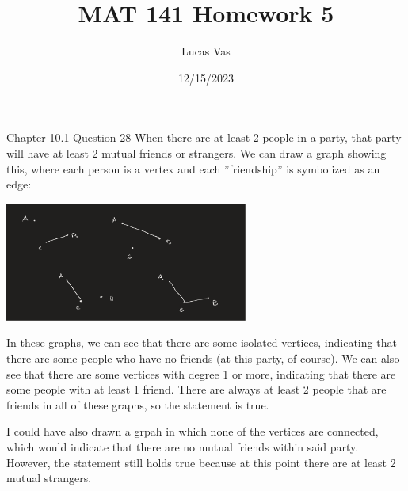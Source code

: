 \documentclass[12pt]{article}
\title{MAT 141 Homework 5}
\author{Lucas Vas}
\date{12/15/2023}
\begin{document}
\maketitle

  \begin{problem}{Chapter 10.1 Question 28}
    When there are at least 2 people in a party, that party will have at least 2 mutual friends or strangers.
    We can draw a graph showing this, where each person is a vertex and each ''friendship'' is symbolized as
    an edge:
    \begin{center}
      \includegraphics[width=8cm]{2friends.png}
    \end{center}
    In these graphs, we can see that there are some isolated vertices, indicating that there are some people
    who have no friends (at this party, of course). We can also see that there are some vertices with degree
    1 or more, indicating that there are some people with at least 1 friend. There are always at least 2 people
    that are friends in all of these graphs, so the statement is true.

    I could have also drawn a grpah in which none of the vertices are connected, which would indicate that 
    there are no mutual friends within said party. However, the statement still holds true because at this point
    there are at least 2 mutual strangers.
  \end{problem}
\end{document}

